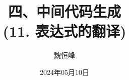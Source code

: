 \documentclass[]{beamer}
\title[语义分析]{四、中间代码生成 \\ (11. 表达式的翻译)}
\author[魏恒峰]{\large 魏恒峰}
\institute{hfwei@nju.edu.cn}
\date{2024年05月10日}
\begin{document}
\maketitle




\thankyou{}

\end{document}
